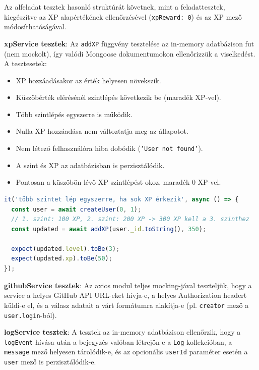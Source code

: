 
Az alfeladat tesztek hasonló struktúrát követnek, mint a feladattesztek, kiegészítve az XP alapértékének ellenőrzésével (\texttt{xpReward: 0}) és az XP mező módosíthatóságával.


\textbf{xpService tesztek}: Az \texttt{addXP} függvény tesztelése az in-memory adatbázison fut (nem mockolt), így valódi Mongoose dokumentumokon ellenőrizzük a viselkedést. A tesztesetek:

\begin{itemize}
  \item XP hozzáadásakor az érték helyesen növekszik.
  \item Küszöbérték elérésénél szintlépés következik be (maradék XP-vel).
  \item Több szintlépés egyszerre is működik.
  \item Nulla XP hozzáadása nem változtatja meg az állapotot.
  \item Nem létező felhasználóra hiba dobódik (\texttt{'User not found'}).
  \item A szint és XP az adatbázisban is perzisztálódik.
  \item Pontosan a küszöbön lévő XP szintlépést okoz, maradék 0 XP-vel.
\end{itemize}

\begin{lstlisting}[language=JavaScript, caption={XP szintlépési teszt (xpService.test.ts)}]
it('több szintet lép egyszerre, ha sok XP érkezik', async () => {
  const user = await createUser(0, 1);
  // 1. szint: 100 XP, 2. szint: 200 XP -> 300 XP kell a 3. szinthez
  const updated = await addXP(user._id.toString(), 350);

  expect(updated.level).toBe(3);
  expect(updated.xp).toBe(50);
});
\end{lstlisting}

\textbf{githubService tesztek}: Az axios modul teljes mocking-jával teszteljük, hogy a service a helyes GitHub API URL-eket hívja-e, a helyes Authorization headert küldi-e el, és a válasz adatait a várt formátumra alakítja-e (pl. \texttt{creator} mező a \texttt{user.login}-ból).

\textbf{logService tesztek}: A tesztek az in-memory adatbázison ellenőrzik, hogy a \texttt{logEvent} hívása után a bejegyzés valóban létrejön-e a \texttt{Log} kollekcióban, a \texttt{message} mező helyesen tárolódik-e, és az opcionális \texttt{userId} paraméter esetén a \texttt{user} mező is perzisztálódik-e.


